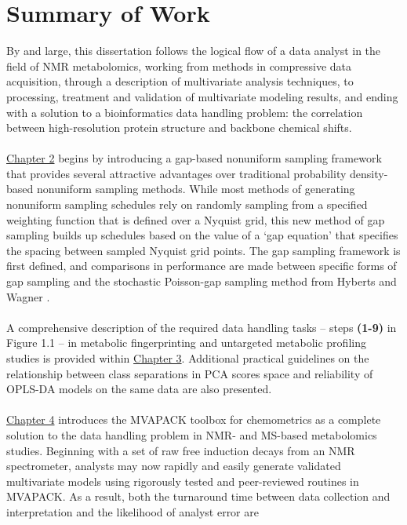 \section{Summary of Work}

\begin{doublespace}
By and large, this dissertation follows the logical flow of a data analyst
in the field of NMR metabolomics, working from methods in compressive data
acquisition, through a description of multivariate analysis techniques, to
processing, treatment and validation of multivariate modeling results, and
ending with a solution to a bioinformatics data handling problem: the
correlation between high-resolution protein structure and backbone chemical
shifts.
\\\\
\hyperlink{chapter.2}{Chapter 2} begins by introducing a gap-based nonuniform
sampling framework that provides several attractive advantages over traditional
probability density-based nonuniform sampling methods. While most methods of
generating nonuniform sampling schedules rely on randomly sampling from a
specified weighting function that is defined over a Nyquist grid, this new
method of gap sampling builds up schedules based on the value of a `gap
equation' that specifies the spacing between sampled Nyquist grid points. The
gap sampling framework is first defined, and comparisons in performance are
made between specific forms of gap sampling and the stochastic Poisson-gap
sampling method from Hyberts and Wagner \cite{hyberts:jacs2010}.
\\\\
A comprehensive description of the required data handling tasks -- steps
{\bf (1-9)} in Figure 1.1 -- in metabolic fingerprinting and untargeted
metabolic profiling studies is provided within
\hyperlink{chapter.3}{Chapter 3}. Additional practical guidelines on the
relationship between class separations in PCA scores space and reliability
of OPLS-DA models on the same data are also presented.
\\\\
\hyperlink{chapter.4}{Chapter 4} introduces the MVAPACK toolbox for
chemometrics as a complete solution to the data handling problem in NMR-
and MS-based metabolomics studies. Beginning with a set of raw free induction
decays from an NMR spectrometer, analysts may now rapidly and easily generate
validated multivariate models using rigorously tested and peer-reviewed
routines in MVAPACK. As a result, both the turnaround time between data
collection and interpretation and the likelihood of analyst error are

\end{doublespace}
